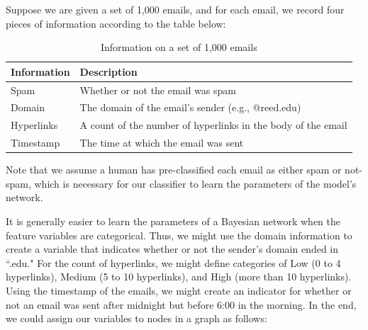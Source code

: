 \documentclass[12pt,twoside]{reedthesis}
\begin{document}
	Suppose we are given a set of 1,000 emails, and for each email, we record four pieces of information according to the table below:
	
		\begin{table}[htdp] %
\caption[Example Data for Classifications]{Information on a set of 1,000 emails} 
\begin{center}
\begin{tabular}{| l | l |} 
 \toprule
  \textbf{Information} & \textbf{Description} \\ %
  \midrule %
   	Spam & Whether or not the email was spam \\
 	Domain & The domain of the email's sender (e.g., @reed.edu) \\	
	Hyperlinks & A count of the number of hyperlinks in the body of the email \\ %
  	Timestamp & The time at which the email was sent \\
\bottomrule %
\end{tabular}
\end{center}
\label{bvf} %
\end{table}
	Note that we assume a human has pre-classified each email as either spam or not-spam, which is necessary for our classifier to learn the parameters of the model's network.
	
	It is generally easier to learn the parameters of a Bayesian network when the feature variables are categorical. Thus, we might use the domain information to create a variable that indicates whether or not the sender's domain ended in ``.edu." For the count of hyperlinks, we might define categories of Low (0 to 4 hyperlinks), Medium (5 to 10 hyperlinks), and High (more than 10 hyperlinks). Using the timestamp of the emails, we might create an indicator for whether or not an email was sent after midnight but before 6:00 in the morning. In the end, we could assign our variables to nodes in a graph as follows:
\end{document}
